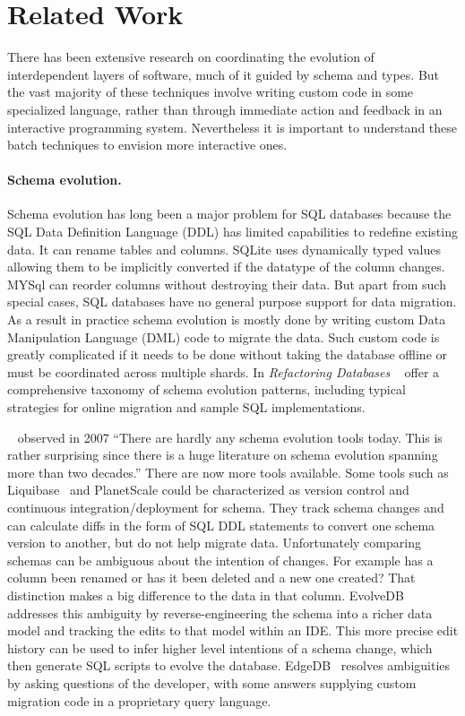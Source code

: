 \documentclass[english,crc]{programming}
\newcommand{\citet}[1]{\citeauthor*{#1}~\cite{#1}}
\begin{document}
\section{Related Work}
\label{sec:related}

There has been extensive research on coordinating the evolution of interdependent layers of software, much of it guided by schema and types. But the vast majority of these techniques involve writing custom code in some specialized language, rather than through immediate action and feedback in an interactive programming system. Nevertheless it is important to understand these batch techniques to envision more interactive ones.

\paragraph{Schema evolution.}
Schema evolution has long been a major problem for SQL databases because
the SQL Data Definition Language (DDL) has limited capabilities to redefine existing data. It can rename tables and columns. SQLite \cite{sqliteDatatypes} uses dynamically typed values allowing them to be implicitly converted if the datatype of the column changes.
MYSql \cite{mysqlAlterTable} can reorder columns without destroying their data. But apart from such special cases, SQL databases have no general purpose support for data migration. As a result in practice schema evolution is mostly done by writing custom Data Manipulation Language (DML) code to migrate the data. Such custom code is greatly complicated if it needs to be done without taking the database offline or must be coordinated across multiple shards.
In \emph{Refactoring Databases} \citet{ambler06} offer a comprehensive taxonomy of schema evolution patterns, including typical strategies for online migration and sample SQL implementations.

\citet{bernstein07} observed in 2007 ``There are hardly any schema evolution tools today. This is rather surprising since there is a huge literature on schema evolution spanning more than two decades.'' There are now more tools available. Some tools such as Liquibase~\cite{liquibase} and PlanetScale\cite{planetscale} could be characterized as version control and continuous integration/deployment for schema. They track schema changes and can calculate diffs in the form of SQL DDL statements to convert one schema version to another, but do not help migrate data. Unfortunately comparing schemas can be ambiguous about the intention of changes. For example has a column been renamed or has it been deleted and a new one created? That distinction makes a big difference to the data in that column. EvolveDB\cite{evolvedb} addresses this ambiguity by reverse-engineering the schema into a richer data model and tracking the edits to that model within an IDE. This more precise edit history can be used to infer higher level intentions of a schema change, which then generate SQL scripts to evolve the database. EdgeDB~\cite{edgedb} resolves ambiguities by asking questions of the developer, with some answers supplying custom migration code in a proprietary query language.
\end{document}
